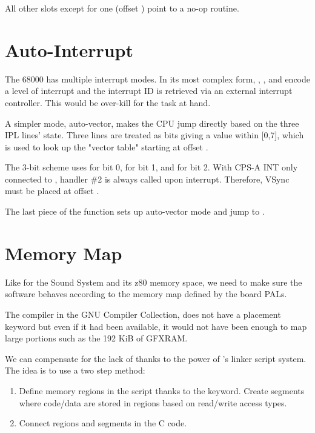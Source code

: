 

All other slots except for one (offset ) point to a no-op routine.




\section{Auto-Interrupt}
The 68000 has multiple interrupt modes. In its most complex form, , , and  encode a level of interrupt and the interrupt ID is retrieved via an external interrupt controller. This would be over-kill for the task at hand.

A simpler mode, auto-vector, makes the CPU jump directly based on the three IPL lines' state. Three lines are treated as bits giving a value within [0,7], which is used to look up the "vector table" starting at offset .

The 3-bit scheme uses  for bit 0,  for bit 1, and  for bit 2. With CPS-A INT only connected to , handler \#2 is always called upon interrupt. Therefore, VSync must be placed at offset .



The last piece of the  function sets up auto-vector mode and jump to .








\section{Memory Map}
Like for the Sound System and its z80 memory space, we need to make sure the software behaves according to the memory map defined by the board PALs.

The compiler in the GNU Compiler Collection,  does not have a placement keyword  but even if it had been available, it would not have been enough to map large portions such as the 192 KiB of GFXRAM.

We can compensate for the lack of  thanks to the power of 's linker script system. The idea is to use a two step method:
\begin{enumerate}
\item Define memory regions in the script thanks to the  keyword. Create segments where code/data are stored in regions based on read/write access types.
\item Connect regions and segments in the C code.
\end{enumerate}


